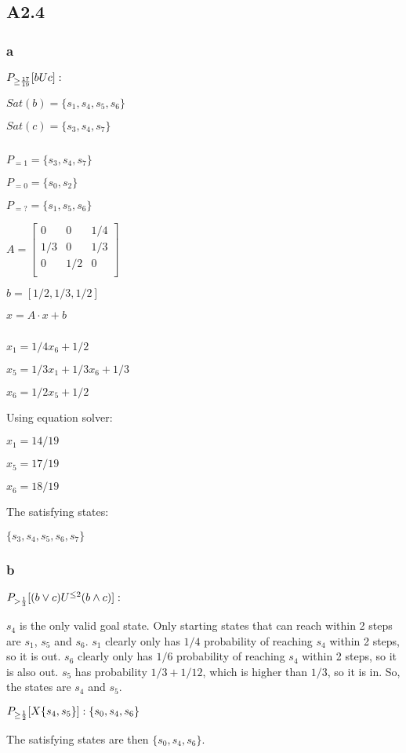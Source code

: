 \subsection{A2.4}

\subsubsection{a}

$P_{\geq {17 \over 19}} [b U c]:$

$Sat(b) = \{s_1, s_4, s_5, s_6\}$

$Sat(c) = \{s_3, s_4, s_7\}$

$ $

$P_{=1} = \{s_3, s_4, s_7\}$

$P_{=0} = \{s_0, s_2\}$

$P_{=?} = \{s_1, s_5, s_6\}$

$
A = \begin{bmatrix}
0   & 0   & 1/4 \\
1/3 & 0   & 1/3 \\
0   & 1/2 & 0 \\
\end{bmatrix}
$

$b = [1/2, 1/3, 1/2]$

$x = A\cdot x + b$

$ $

$x_1 = 1/4x_6 + 1/2$

$x_5 = 1/3x_1 + 1/3x_6 + 1/3$

$x_6 = 1/2x_5 + 1/2$

Using equation solver:

$x_1 = 14/19$

$x_5 = 17/19$

$x_6 = 18/19$

The satisfying states:

$\{s_3, s_4, s_5, s_6, s_7\}$

\subsubsection{b}

$P_{>{1\over3}} [(b \vee c) U^{\leq2} (b \wedge c)]:$

$s_4$ is the only valid goal state.
Only starting states that can reach within 2 steps are $s_1$, $s_5$ and $s_6$.
$s_1$ clearly only has $1/4$ probability of reaching $s_4$ within 2 steps, so it is out.
$s_6$ clearly only has $1/6$ probability of reaching $s_4$ within 2 steps, so it is also out.
$s_5$ has probability $1/3 + 1/12$, which is higher than $1/3$, so it is in.
So, the states are $s_4$ and $s_5$.

$P_{\geq {1\over2}} [X \{s_4, s_5\}]: \{s_0, s_4, s_6\}$

The satisfying states are then $\{s_0, s_4, s_6\}$.

